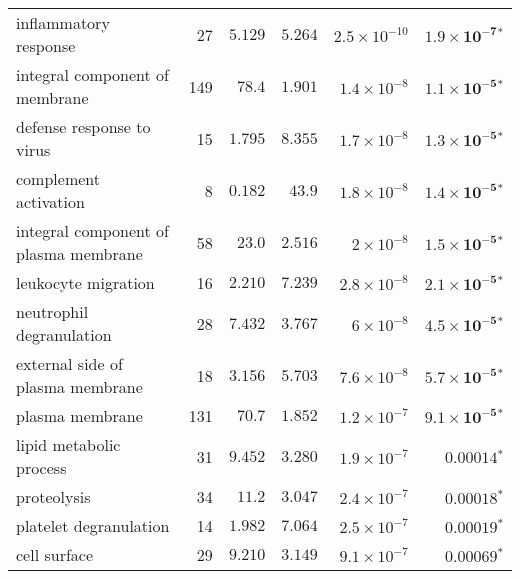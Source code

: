 \begin{longtable}{|l|r|r|r|r|r|}
                             inflammatory response &                      27 &                $ 5.129$ &   $ 5.264$ & $2.5\times 10^{-10}$ &   $\bm{1.9\times 10^{-7}{^*}}$ \\
                    integral component of membrane &                     149 &                $  78.4$ &   $ 1.901$ &  $1.4\times 10^{-8}$ &   $\bm{1.1\times 10^{-5}{^*}}$ \\
                         defense response to virus &                      15 &                $ 1.795$ &   $ 8.355$ &  $1.7\times 10^{-8}$ &   $\bm{1.3\times 10^{-5}{^*}}$ \\
                             complement activation &                       8 &                $ 0.182$ &   $  43.9$ &  $1.8\times 10^{-8}$ &   $\bm{1.4\times 10^{-5}{^*}}$ \\
             integral component of plasma membrane &                      58 &                $  23.0$ &   $ 2.516$ &   $ 2\times 10^{-8}$ &   $\bm{1.5\times 10^{-5}{^*}}$ \\
                               leukocyte migration &                      16 &                $ 2.210$ &   $ 7.239$ &  $2.8\times 10^{-8}$ &   $\bm{2.1\times 10^{-5}{^*}}$ \\
                          neutrophil degranulation &                      28 &                $ 7.432$ &   $ 3.767$ &   $ 6\times 10^{-8}$ &   $\bm{4.5\times 10^{-5}{^*}}$ \\
                  external side of plasma membrane &                      18 &                $ 3.156$ &   $ 5.703$ &  $7.6\times 10^{-8}$ &   $\bm{5.7\times 10^{-5}{^*}}$ \\
                                   plasma membrane &                     131 &                $  70.7$ &   $ 1.852$ &  $1.2\times 10^{-7}$ &   $\bm{9.1\times 10^{-5}{^*}}$ \\
                           lipid metabolic process &                      31 &                $ 9.452$ &   $ 3.280$ &  $1.9\times 10^{-7}$ &             $\bm{0.00014{^*}}$ \\
                                       proteolysis &                      34 &                $  11.2$ &   $ 3.047$ &  $2.4\times 10^{-7}$ &             $\bm{0.00018{^*}}$ \\
                            platelet degranulation &                      14 &                $ 1.982$ &   $ 7.064$ &  $2.5\times 10^{-7}$ &             $\bm{0.00019{^*}}$ \\
                                      cell surface &                      29 &                $ 9.210$ &   $ 3.149$ &  $9.1\times 10^{-7}$ &             $\bm{0.00069{^*}}$ \\

\end{longtable}
